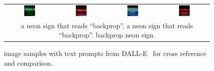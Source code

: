 \begin{figure}[ht!]
\begin{tabular}{cccc}
        \includegraphics[width=0.24\textwidth]{figures/cross/backprop_0.jpg} &
        \includegraphics[width=0.24\textwidth]{figures/cross/backprop_1.jpg} &
        \includegraphics[width=0.24\textwidth]{figures/cross/backprop_2.jpg} &
        \includegraphics[width=0.24\textwidth]{figures/cross/backprop_3.jpg} \vspace{-1mm}\\
        \multicolumn{4}{c}{\small a neon sign that reads “backprop”. a neon sign that reads “backprop”. backprop neon sign.}\\
    \end{tabular}
    \caption{\bdraw image samples with text prompts from DALL-E~\cite{ramesh2021zero} for cross reference and comparison.}
    \label{figs:cross_reference_1}
\end{figure}